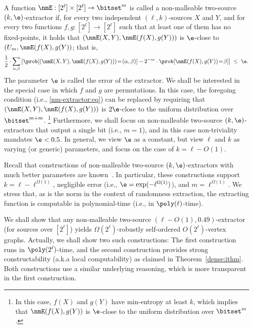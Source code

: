 %
\label{nmExtractor:def}
A function ${\nmE}:[2^\ell]\times[2^\ell]\to\bitset^m$
is called a {\sf non-malleable two-source $(k,\e)$-extractor}
if, for every two independent $(\ell,k)$-sources $X$ and $Y$,
and for every two functions $f,g:[2^\ell]\to[2^\ell]$
such that at least one of them has no fixed-points,
it holds that $(\nmE(X,Y),\nmE(f(X),g(Y)))$ is $\e$-close
to $(U_m,\nmE(f(X),g(Y))$; that is,
\begin{equation}\label{nm-extractor:eq}
\frac12\cdot\sum_{\alpha,\beta}
    \left|\prob[(\nmE(X,Y),\nmE(f(X),g(Y)))\!=\!(\alpha,\beta)]
          -2^{-m}\cdot\prob[\nmE(f(X),g(Y))\!=\!\beta]\right|
 \;\leq\;\e.
\end{equation}
The parameter $\e$ is called the {\sf error} of the extractor.
%
\ED
We shall be interested in the special case in which $f$ and $g$
are permutations. In this case, the foregoing condition
(i.e., \eqref{nm-extractor:eq})
can be replaced by requiring that $(\nmE(X,Y),\nmE(f(X),g(Y)))$
is $2\e$-close to the uniform distribution over $\bitset^{m+m}$.
\footnote{In this case, $f(X)$ and $g(Y)$ have min-entropy at
least $k$, which implies that $\nmE(f(X),g(Y))$ is $\e$-close
to the uniform distribution over $\bitset^{m}$.}
%
Furthermore, we shall focus on non-malleable two-source $(k,\e)$-extractors
that output a single bit (i.e., $m=1$),
and in this case non-triviality mandates $\e<0.5$.
In general, we view $\e$ as a constant,
but view $\ell$ and $k$ as varying (or generic) parameters,
and focus on the case of $k=\ell-O(1)$.

Recall that constructions of non-malleable two-source $(k,\e)$-extractors
with much better parameters are known~\cite[Thm.~1]{CGL}.
In particular, these constructions support $k=\ell-\ell^{\Omega(1)}$,
negligible error (i.e., $\e=\exp(-\ell^{\Omega(1)})$),
and $m=\ell^{\Omega(1)}$.
We stress that, as is the norm in the context of randomness extraction,
the extracting function is computable in polynomial-time
(i.e., in $\poly(\ell)$-time).


%
We shall show that any non-malleable two-source $(\ell-O(1),0.49)$-extractor
(for sources over $[2^\ell]$)
yields $\Omega(2^\ell)$-robustly self-ordered $O(2^\ell)$-vertex graphs.
Actually, we shall show two such constructions:
The first construction runs in $\poly(2^\ell)$-time,
and the second construction provides strong constructability
(a.k.a local computability) as claimed in Theorem~\ref{dense:ithm}.
Both constructions use a similar underlying reasoning,
which is more transparent in the first construction.

